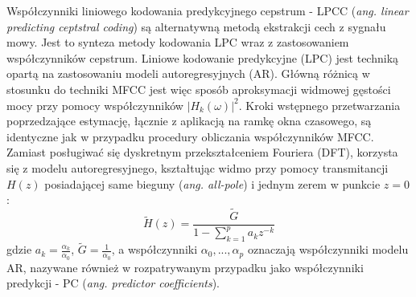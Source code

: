 Współczynniki liniowego kodowania predykcyjnego cepstrum - LPCC (\textit{ang. linear predicting ceptstral coding}) są alternatywną metodą ekstrakcji cech z sygnału mowy. Jest to synteza metody kodowania LPC wraz z zastosowaniem współczynników cepstrum. Liniowe kodowanie predykcyjne (LPC) jest techniką opartą na zastosowaniu modeli autoregresyjnych (AR). Główną różnicą w stosunku do techniki MFCC jest więc sposób aproksymacji widmowej gęstości mocy przy pomocy współczynników $|H_k(\omega)|^2$. Kroki wstępnego przetwarzania poprzedzające estymację, łącznie z aplikacją na ramkę okna czasowego, są identyczne jak w przypadku procedury obliczania współczynników MFCC. Zamiast posługiwać się dyskretnym przekształceniem Fouriera (DFT), korzysta się z modelu autoregresyjnego, kształtując widmo przy pomocy transmitancji $H(z)$ posiadającej same bieguny (\textit{ang. all-pole}) i jednym zerem w punkcie $z =0$:
\begin{equation}
  \label{transar}
  \tilde{H}(z) = \frac{\tilde{G}}{1-\sum_{k=1}^{p} a_k z^{-k}}
\end{equation}
gdzie $ a_k = \frac{\alpha_k}{\alpha_0} $, $\tilde{G} = \frac{1}{\alpha_0}$, a współczynniki $\alpha_0,...,\alpha_p$ oznaczają współczynniki modelu AR, nazywane również w rozpatrywanym przypadku jako współczynniki predykcji - PC (\textit{ang. predictor coefficients}).

